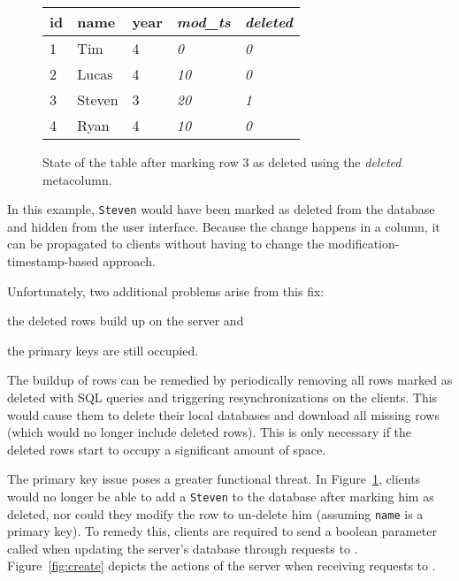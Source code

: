 \begin{figure}[h!]
\center
\begin{tabular}{ l  l  l  l  l}
id  & name      & year  & \textit{mod\_ts} & \textit{deleted} \\ 
\hline
1   & Tim   & 4     & \textit{0}   & \textit{0}     \\
2   & Lucas     & 4     & \textit{10}   & \textit{0}     \\
3   & Steven    & 3     & \textit{20}   & \textit{1}     \\
4   & Ryan      & 4     & \textit{10}   & \textit{0}     \\
\end{tabular}
\caption{State of the  table after marking row 3 as deleted using
the \textit{deleted} metacolumn.}
\label{fig:new_deleted}
\end{figure}

In this example, \texttt{Steven} would have been marked as deleted from the
database and hidden from the user interface. Because the change happens in a
column, it can be propagated to clients without having to change the
modification-timestamp-based approach.

Unfortunately, two additional problems arise from this fix: 
\begin{inparaenum}
\item the deleted rows build up on the server and
\item the primary keys are still occupied. 
\end{inparaenum}
The buildup of rows can be remedied by periodically removing all rows marked as
deleted with SQL  queries and triggering resynchronizations on the
clients. This would cause them to delete their local databases and download all
missing rows (which would no longer include deleted rows). This is only
necessary if the deleted rows start to occupy a significant amount of space.

The primary key issue poses a greater functional threat. In Figure~\ref{fig:new_deleted}, clients
would no longer be able to add a \texttt{Steven} to the database after marking
him as deleted, nor could they modify the row to un-delete him (assuming
\texttt{name} is a primary key). To remedy this, clients are required to send a
boolean parameter called  when updating the server's
database through requests to \create. Figure~\ref{fig:create} depicts
the actions of the server when receiving requests to \create.


